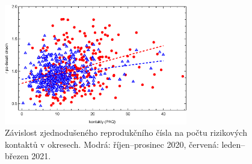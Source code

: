 \begin{enumerate}
\begin{figure}
\begin{center}
\includegraphics[width=8cm]{pic/sbornikRegrese010.eps}
\caption{Závislost zjednodušeného reprodukčního čísla na počtu rizikových kontaktů v okresech. Modrá: říjen--prosinec 2020, červená: leden--březen 2021.}
\label{fig:okresy}
\end{center}
\end{figure}


\end{enumerate}

